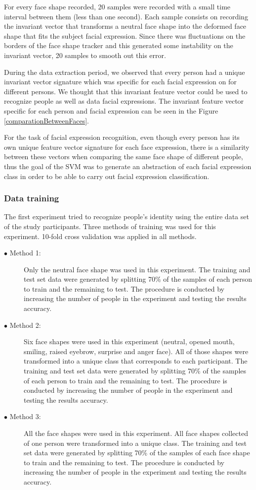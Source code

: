 \documentclass[]{article}
\begin{document}
For every face shape recorded, 20 samples were recorded with a small time
interval between them (less than one second). Each sample consists on recording
the invariant vector that transforms a neutral face shape into the deformed
face shape that fits the subject facial expression. Since there was fluctuations on the borders
of the face shape tracker and this generated some instability on the
invariant vector, 20 samples to smooth out this error.

During the data extraction period, we observed that every person had a unique invariant vector signature which was
specific for each facial expression on for different persons. We thought that this invariant feature vector could be
used to recognize people as well as data facial expressions. The invariant feature vector specific for each person and
facial expression can be seen in the Figure \ref{comparationBetweenFaces}.

For the task of facial expression recognition, even though every person has its own unique feature vector signature for
each face expression, there is a similarity between these vectors when comparing the same face shape of different
people, thus the goal of the SVM was to generate an abstraction of each facial expression class in order to be able to
carry out facial expression classification.

\subsubsection{Data training}

The first experiment tried to recognize people's identity using the entire data
set of the study participants. Three methods of training was used for this
experiment. 10-fold cross validation was applied in all methods.

\begin{description}
\item[$\bullet$ Method 1:]Only the neutral face shape was used in this
experiment.  The training and test set data were generated by splitting 70\% of
the samples of each person to train and the remaining to test. The procedure is
conducted by increasing the number of people in the experiment and testing the 
results accuracy.
\item[$\bullet$ Method 2:]Six face shapes were used in this experiment (neutral,
opened mouth, smiling, raised eyebrow, surprise and anger face). All of those
shapes were transformed into a unique class that corresponds to each
participant. The training and test set data were generated by splitting 70\% of
the samples of each person to train and the remaining to test. The procedure is conducted by
increasing the number of people in the experiment and testing the results
accuracy.
\item[$\bullet$ Method 3:]All the face shapes were used in this experiment. All
face shapes collected of one person were transformed into a unique class. The
training and test set data were generated by splitting 70\% of the samples of
each face shape to train and the remaining to test. The procedure is conducted
by increasing the number of people in the experiment and testing the results
accuracy.
\end{description}
\end{document}
